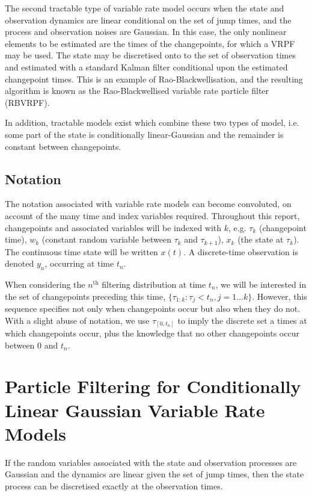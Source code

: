 \documentclass[a4paper,10pt]{article}
\begin{document}
The second tractable type of variable rate model occurs when the state and observation dynamics are linear conditional on the set of jump times, and the process and observation noises are Gaussian. In this case, the only nonlinear elements to be estimated are the times of the changepoints, for which a VRPF may be used. The state may be discretised onto to the set of observation times and estimated with a standard Kalman filter conditional upon the estimated changepoint times. This is an example of Rao-Blackwellisation, and the resulting algorithm is known as the Rao-Blackwellised variable rate particle filter (RBVRPF).

In addition, tractable models exist which combine these two types of model, i.e. some part of the state is conditionally linear-Gaussian and the remainder is constant between changepoints.



\subsection{Notation}
The notation associated with variable rate models can become convoluted, on account of the many time and index variables required. Throughout this report, changepoints and associated variables will be indexed with $k$, e.g. $\tau_k$ (changepoint time), $w_k$ (constant random variable between $\tau_k$ and $\tau_{k+1}$), $x_k$ (the state at $\tau_k$). The continuous time state will be written $x(t)$. A discrete-time observation is denoted $y_n$, occurring at time $t_n$.

When considering the $n^{\text{th}}$ filtering distribution at time $t_n$, we will be interested in the set of changepoints preceding this time, $\{\tau_{1:k} : \tau_j < t_n, j=1 \dots k\}$. However, this sequence specifies not only when changepoints occur but also when they do not. With a slight abuse of notation, we use $\tau_{[0,t_n]}$ to imply the discrete set a times at which changepoints occur, plus the knowledge that no other changepoints occur between $0$ and $t_n$.



\section{Particle Filtering for Conditionally Linear Gaussian Variable Rate Models}
If the random variables associated with the state and observation processes are Gaussian and the dynamics are linear given the set of jump times, then the state process can be discretised exactly at the observation times.
\end{document}

